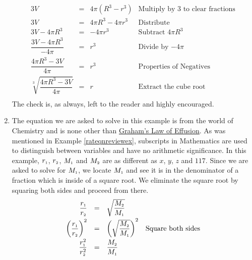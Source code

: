 \documentclass{ximera}
\begin{document}
\begin{example}
\begin{enumerate}
\[\begin{array}{rclr}
3V & = & 4\pi (R^3 - r^3) &  \text{Multiply by $3$ to clear fractions}\\[2pt]

3V & = & 4\pi R^3 - 4\pi r^3 & \text{Distribute} \\[2pt]

3V - 4\pi R^3 & = & -4 \pi r^3 & \text{Subtract $4 \pi R^3$} \\[2pt]

\dfrac{3V - 4\pi R^3}{-4\pi} & = & r^3 & \text{Divide by $-4\pi$} \\[8pt]

\dfrac{4\pi R^3 - 3V}{4\pi} & = & r^3 & \text{Properties of Negatives} \\[10pt]

\sqrt[3]{\dfrac{4\pi R^3 - 3V}{4\pi}} & = & r & \text{Extract the cube root} \\

\end{array} \] The check is, as always, left to the reader and highly encouraged.

\item  The equation we are asked to solve in this example is from the world of Chemistry and is none other than \href{http://en.wikipedia.org/wiki/Graham's_law}{\underline{Graham's Law of Effusion}}.  As was mentioned in Example \ref{rateqnreviewex}, subscripts in Mathematics are used to distinguish between variables and have no arithmetic significance.  In this example, $r_{\text{\tiny$1$}}$, $r_{\text{\tiny$2$}}$, $M_{\text{\tiny$1$}}$ and $M_{\text{\tiny$2$}}$ are as different as $x$, $y$, $z$ and $117$.  Since we are asked to solve for $M_{\text{\tiny$1$}}$, we locate $M_{\text{\tiny$1$}}$ and see it is in the denominator of a fraction which is inside of a square root.  We eliminate the square root by squaring both sides and proceed from there.  \[ \begin{array}{rclr}

 \dfrac{r_{\text{\tiny$1$}}}{r_{\text{\tiny$2$}}} & = &  \sqrt{\dfrac{M_{\text{\tiny$2$}}}{M_{\text{\tiny$1$}}}} & \\[8pt]

\left(\dfrac{r_{\text{\tiny$1$}}}{r_{\text{\tiny$2$}}}\right)^2 & = & \left(\sqrt{\dfrac{M_{\text{\tiny$2$}}}{M_{\text{\tiny$1$}}}}\right)^2 & \text{Square both sides} \\[8pt]

\dfrac{r_{\text{\tiny$1$}}^2}{r_{\text{\tiny$2$}}^2} & = & \dfrac{M_{\text{\tiny$2$}}}{M_{\text{\tiny$1$}}} & \\[8pt]


\end{array}\]
\end{enumerate}
\end{example}
\end{document}
